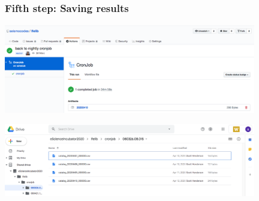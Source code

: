 \documentclass{beamer}
\begin{document}
	\begin{frame}
		\frametitle{Fifth step: Saving results}
		\includegraphics[width=11cm]{artifacts.png}

		\vspace{1cm}

		\includegraphics[width=11cm]{googledrive.png}
	\end{frame}
\end{document}
